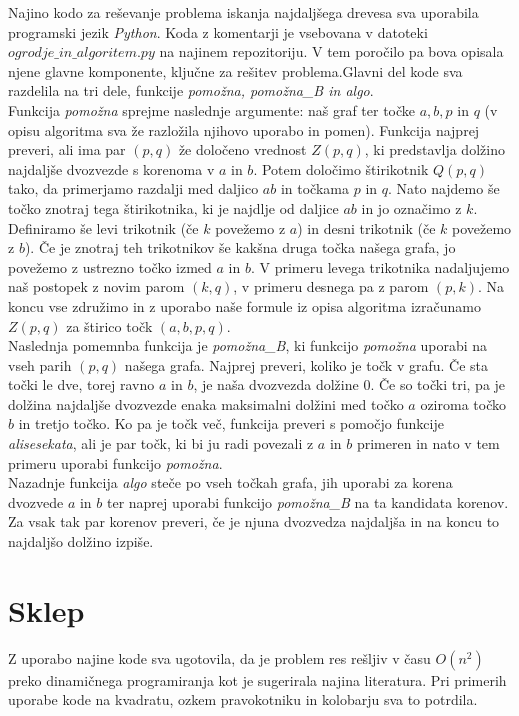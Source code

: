 \documentclass[a4paper,12pt]{article}
\begin{document}
Najino kodo za reševanje problema iskanja najdaljšega drevesa sva uporabila programski jezik \emph{Python}.
  Koda z komentarji je vsebovana v datoteki \emph{$ogrodje\_in\_algoritem.py$} na najinem repozitoriju.
   V tem poročilo pa bova opisala njene glavne komponente, ključne za rešitev problema.Glavni del kode sva razdelila na tri dele, funkcije \emph{pomožna, pomožna\_B in algo}. \\
Funkcija \emph{pomožna} sprejme naslednje argumente: naš graf ter točke $a, b, p$ in $q$ (v opisu algoritma sva že razložila njihovo uporabo in pomen).
 Funkcija najprej preveri, ali ima par $(p, q)$ že določeno vrednost $Z(p,q)$, 
 ki predstavlja dolžino najdaljše dvozvezde s korenoma v $a$ in $b$. Potem določimo štirikotnik $Q(p,q)$ tako, 
 da primerjamo razdalji med daljico $ab$ in točkama $p$ in $q$. 
 Nato najdemo še točko znotraj tega štirikotnika, ki je najdlje od daljice $ab$ in jo označimo z $k$.
  Definiramo še levi trikotnik (če $k$ povežemo z $a$) in desni trikotnik (če $k$ povežemo z $b$). 
  Če je znotraj teh trikotnikov še kakšna druga točka našega grafa, jo povežemo z ustrezno točko izmed $a$ in $b$.
   V primeru levega trikotnika nadaljujemo naš postopek z novim parom $(k,q)$, v primeru desnega pa z parom $(p, k)$.
    Na koncu vse združimo in z uporabo naše formule iz opisa algoritma izračunamo $Z(p,q)$ za štirico točk $(a, b, p, q)$. \\
Naslednja pomemnba funkcija je \emph{pomožna\_B}, ki funkcijo \emph{pomožna} uporabi na vseh parih $(p,q)$ našega grafa.
 Najprej preveri, koliko je točk v grafu. Če sta točki le dve, torej ravno $a$ in $b$, je naša dvozvezda dolžine $0$. 
 Če so točki tri, pa je dolžina najdaljše dvozvezde enaka maksimalni dolžini med točko $a$ oziroma točko $b$ in tretjo točko.
  Ko pa je točk več, funkcija preveri s pomočjo funkcije \emph{alisesekata}, ali je par točk,
   ki bi ju radi povezali z $a$ in $b$ primeren in nato v tem primeru uporabi funkcijo \emph{pomožna}. \\
Nazadnje funkcija \emph{algo} steče po vseh točkah grafa, jih uporabi za korena dvozvede $a$ in $b$ 
ter naprej uporabi funkcijo \emph{pomožna\_B} na ta kandidata korenov. 
Za vsak tak par korenov preveri, če je njuna dvozvedza najdaljša in na koncu to najdaljšo dolžino izpiše. 

\section{Sklep}

Z uporabo najine kode sva ugotovila, da je problem res rešljiv v času $O(n^2)$ preko dinamičnega programiranja kot je sugerirala najina literatura. Pri primerih uporabe kode na kvadratu, ozkem pravokotniku in kolobarju sva to potrdila. 
\end{document}
